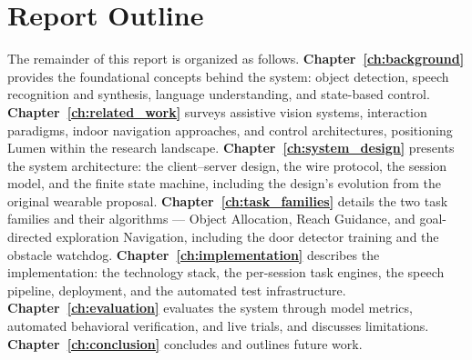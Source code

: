 \section{Report Outline}
\label{sec:report_outline}

The remainder of this report is organized as follows.
\textbf{Chapter~\ref{ch:background}} provides the foundational concepts behind the
system: object detection, speech recognition and synthesis, language understanding,
and state-based control. \textbf{Chapter~\ref{ch:related_work}} surveys assistive
vision systems, interaction paradigms, indoor navigation approaches, and control
architectures, positioning Lumen within the research landscape.
\textbf{Chapter~\ref{ch:system_design}} presents the system architecture: the
client--server design, the wire protocol, the session model, and the finite state
machine, including the design's evolution from the original wearable proposal.
\textbf{Chapter~\ref{ch:task_families}} details the two task families and their
algorithms --- Object Allocation, Reach Guidance, and goal-directed exploration
Navigation, including the door detector training and the obstacle watchdog.
\textbf{Chapter~\ref{ch:implementation}} describes the implementation: the technology
stack, the per-session task engines, the speech pipeline, deployment, and the
automated test infrastructure. \textbf{Chapter~\ref{ch:evaluation}} evaluates the
system through model metrics, automated behavioral verification, and live trials, and
discusses limitations. \textbf{Chapter~\ref{ch:conclusion}} concludes and outlines
future work.